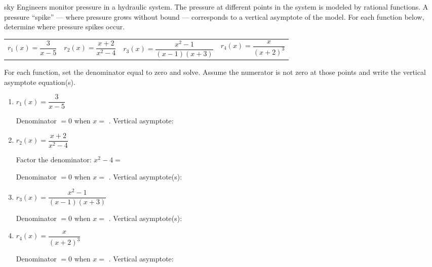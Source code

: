 \documentclass[10pt]{article}
\begin{document}
\namepartnerperiod

\vspace{0.1in}

\begin{scenariobox}{sky}
\small
Engineers monitor pressure in a hydraulic system. The pressure at different points in the
system is modeled by rational functions. A pressure ``spike'' --- where pressure grows without
bound --- corresponds to a vertical asymptote of the model. For each function below, determine
where pressure spikes occur.

\medskip
\renewcommand{\arraystretch}{1.4}
\begin{tabular}{@{} l l @{\qquad} l l @{}}
$r_1(x) = \dfrac{3}{x - 5}$ &
$r_2(x) = \dfrac{x + 2}{x^2 - 4}$ &
$r_3(x) = \dfrac{x^2 - 1}{(x-1)(x+3)}$ &
$r_4(x) = \dfrac{x}{(x+2)^3}$
\end{tabular}
\end{scenariobox}

\vspace{0.1in}

\begin{tcolorbox}[colback=white, colframe=black!40,
    title=\textbf{Tier R --- Remediate},
    fonttitle=\bfseries, arc=2mm, left=3mm, right=3mm, top=2mm, bottom=2mm]

For each function, set the denominator equal to zero and solve. Assume the numerator is not
zero at those points and write the vertical asymptote equation(s).

\begin{enumerate}[itemsep=10pt]
  \item $r_1(x) = \dfrac{3}{x - 5}$

        Denominator $= 0$ when $x =$ \blank{2cm}. \quad Vertical asymptote: \blank{3cm}

  \item $r_2(x) = \dfrac{x + 2}{x^2 - 4}$

        Factor the denominator: $x^2 - 4 =$ \blank{4cm}

        Denominator $= 0$ when $x =$ \blank{3.5cm}. \quad Vertical asymptote(s): \blank{3.5cm}

  \item $r_3(x) = \dfrac{x^2 - 1}{(x-1)(x+3)}$

        Denominator $= 0$ when $x =$ \blank{3.5cm}. \quad Vertical asymptote(s): \blank{3.5cm}

  \item $r_4(x) = \dfrac{x}{(x+2)^3}$

        Denominator $= 0$ when $x =$ \blank{2cm}. \quad Vertical asymptote: \blank{3cm}
\end{enumerate}
\end{tcolorbox}
\end{document}
